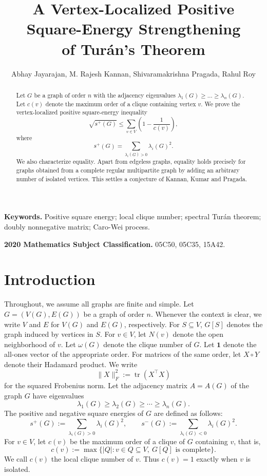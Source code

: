 \documentclass[11pt]{article}
\title{A Vertex-Localized Positive Square-Energy Strengthening\\
	of Tur\'an's Theorem}
\author{Abhay Jayarajan,  M. Rajesh Kannan,
	Shivaramakrishna Pragada,  Rahul Roy}
\date{}
\numberwithin{equation}{section}
\theoremstyle{definition}
\theoremstyle{remark}
\newcommand{\splus}{s^{+}}
\newcommand{\sminus}{s^{-}}
\begin{document}
	
	\maketitle
	
	\begin{abstract}
		Let $G$ be a graph of order $n$ with the adjacency eigenvalues $\lambda_1(G) \geq \dots \geq \lambda_n(G) $. Let $c(v)$ denote the maximum
		order of a clique containing vertex $v$.  We prove the vertex-localized
		positive square-energy inequality
		\[
		\sqrt{\splus(G)}
		\leq 
		\sum_{v\in V}\left(1-\frac1{c(v)}\right),
		\]
		where
		\[
		\splus(G)=\sum_{\lambda_i(G)>0}\lambda_i(G)^2.
		\]
		We also characterize equality. Apart from edgeless graphs, equality holds precisely for graphs obtained
		from a complete regular multipartite graph by adding an arbitrary number
		of isolated vertices. This settles a conjecture of Kannan, Kumar and Pragada. 
		
	\end{abstract}
	
	\noindent\textbf{Keywords.}
	Positive square energy; local clique number; spectral Tur\'an theorem;
	doubly nonnegative matrix; Caro-Wei process.
	
	\medskip
	\noindent\textbf{2020 Mathematics Subject Classification.}
	05C50, 05C35, 15A42.
	
	\section{Introduction}
	
	Throughout, we assume all graphs are finite and simple.  Let $G=(V(G),E(G))$ be a
	graph of order $n$. Whenever the context is clear, we write $V$ and $ E$ for $V(G)$ and $E(G)$, respectively. For $S\subseteq V$, $G[S]$ denotes the graph induced by vertices in $S$. For $v\in V$, let $N(v)$ denote the open neighborhood of $v$. Let $\omega(G)$ denote the clique number of $G$.
	Let $\mathbf 1$ denote the all-ones vector of the appropriate order.
	For matrices of the same order, let $X\circ Y$ denote their
	Hadamard product.
	We write
	\[
	\|X\|_F^2:=\operatorname{tr}(X^{\top}X)
	\]
	for the squared Frobenius norm. Let the adjacency matrix $A=A(G)$ of the graph $G$ have eigenvalues
	\[
	\lambda_1(G)\geq\lambda_2(G)\geq\cdots\geq\lambda_n(G).
	\]
	The positive and negative square energies of $G$ are defined as follows: 
	\[
	\splus(G):=\sum_{\lambda_i(G)>0}\lambda_i(G)^2,
	\qquad
	\sminus(G):=\sum_{\lambda_i(G)<0}\lambda_i(G)^2.
	\]
	For $v\in V$, let $c(v)$ be the maximum order of a clique of $G$
	containing $v$, that is,
	\[
	c(v):=
	\max\bigl\{|Q|:v\in Q\subseteq V,\ G[Q]\text{ is complete}\bigr\}.
	\]
	We call $c(v)$ the local clique number of $v$.
	Thus $c(v)=1$ exactly when $v$ is isolated. 
	
\end{document}
